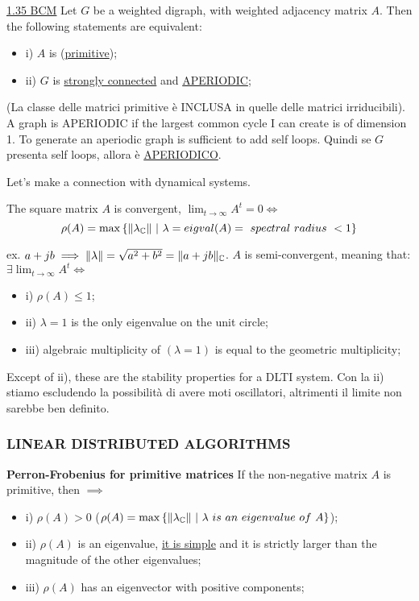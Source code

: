 \begin{prop}{\underline{1.35 BCM}}
\label{primitif}
Let $G$ be a weighted digraph, with weighted adjacency matrix $A$. Then the following statements are equivalent:
\begin{itemize}
\item{i)} $A$ is (\underline{primitive});
\item{ii)} $G$ is \underline{strongly connected} and \underline{APERIODIC}; 
\end{itemize}
\end{prop}

(La classe delle matrici primitive è INCLUSA in quelle delle matrici irriducibili). A graph is APERIODIC if the largest common cycle I can create is of dimension 1. To generate an aperiodic graph is sufficient to add self loops. Quindi se $G$ presenta self loops, allora è \underline{APERIODICO}. 

Let's make a connection with dynamical systems.

\begin{lemma}
The square matrix $A$ is convergent, $\lim_{t\to\infty}{A^t}=0 \iff$
\[
	\rho(A) = \max{\{\norma{\lambda_\C}\ |\ \lambda = eigval(A) =\ spectral\ radius\ < 1\}}
\]

ex. $a+jb \implies \lVert\lambda\rVert = \sqrt{a^2+b^2} = \lVert a+jb\rVert_\mathbb{C}$. $A$ is semi-convergent, meaning that: $\exists \lim_{t\to\infty}{A^t} \iff$
\begin{itemize}
\item{i)} $\rho(A) \leq 1$;
\item{ii)} $\lambda=1$ is the only eigenvalue on the unit circle;
\item{iii)} algebraic multiplicity of $(\lambda=1)$ is equal to the geometric multiplicity;
\end{itemize}
\end{lemma}

Except of ii), these are the stability properties for a DLTI system. Con la ii) stiamo escludendo la possibilità di avere moti oscillatori, altrimenti il limite non sarebbe ben definito.

\subsubsection{LINEAR DISTRIBUTED ALGORITHMS}

\begin{thrm}{\textbf{Perron-Frobenius for primitive matrices}} \newline
\label{perfrobn}
If the non-negative matrix $A$ is primitive, then $\implies$
\begin{itemize}
\item{i)} $\rho(A)>0$ ($\rho(A)=\max{\{\norma{\lambda_\C}\ |\ \lambda\ is\ an\ eigenvalue\ of\ A\}}$);
\item{ii)} $\rho(A)$ is an eigenvalue, \underline{it is simple} and it is strictly larger than the magnitude of the other eigenvalues;
\item{iii)} $\rho(A)$ has an eigenvector with positive components;
\end{itemize}
\end{thrm}

